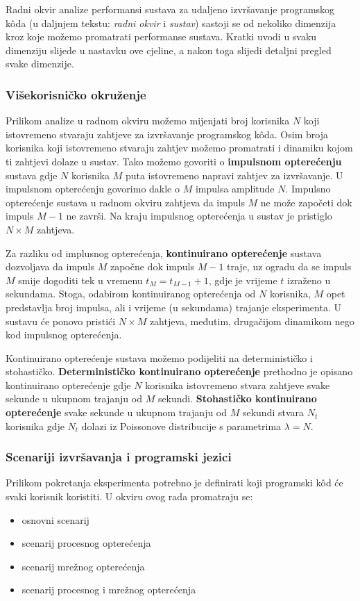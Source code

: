 \documentclass[times, utf8, diplomski]{fer}
\begin{document}
Radni okvir analize performansi sustava za udaljeno izvršavanje programskog kôda (u daljnjem tekstu: \textit{radni okvir} i \textit{sustav}) sastoji se od nekoliko dimenzija kroz koje možemo promatrati performanse sustava. Kratki uvodi u svaku dimenziju slijede u nastavku ove cjeline, a nakon toga slijedi detaljni pregled svake dimenzije.

\subsubsection{Višekorisničko okruženje}
Prilikom analize u radnom okviru možemo mijenjati broj korisnika $N$ koji istovremeno stvaraju zahtjeve za izvršavanje programskog kôda. Osim broja korisnika koji istovremeno stvaraju zahtjev možemo promatrati i dinamiku kojom ti zahtjevi dolaze u sustav. Tako možemo govoriti o \textbf{impulsnom opterećenju} sustava gdje $N$ korisnika $M$ puta istovremeno napravi zahtjev za izvršavanje. U impulsnom opterećenju govorimo dakle o $M$ impulsa amplitude $N$. Impulsno opterećenje sustava u radnom okviru zahtjeva da impuls $M$ ne može započeti dok impuls $M-1$ ne završi. Na kraju impulsnog opterećenja u sustav je pristiglo $N \times M$ zahtjeva.

Za razliku od implusnog opterećenja, \textbf{kontinuirano opterećenje} sustava dozvoljava da impuls $M$ započne dok impuls $M-1$ traje, uz ogradu da se impuls $M$ smije dogoditi tek u vremenu $t_{M} = t_{M-1} + 1$, gdje je vrijeme $t$ izraženo u sekundama. Stoga, odabirom kontinuiranog opterećenja od $N$ korisnika, $M$ opet predstavlja broj impulsa, ali i vrijeme (u sekundama) trajanje eksperimenta. U sustavu će ponovo pristići $N \times M$ zahtjeva, međutim, drugačijom dinamikom nego kod impulsnog opterećenja.

Kontinuirano opterećenje sustava možemo podijeliti na determinističko i stohastičko. \textbf{Determinističko kontinuirano opterećenje} prethodno je opisano kontinuirano opterećenje gdje $N$ korisnika istovremeno stvara zahtjeve svake sekunde u ukupnom trajanju od $M$ sekundi. \textbf{Stohastičko kontinuirano opterećenje} svake sekunde u ukupnom trajanju od $M$ sekundi stvara $N_t$ korisnika gdje $N_t$ dolazi iz Poissonove distribucije s parametrima $\lambda = N$.

\subsubsection{Scenariji izvršavanja i programski jezici}
Prilikom pokretanja eksperimenta potrebno je definirati koji programski kôd će svaki korisnik koristiti. U okviru ovog rada promatraju se:
\begin{itemize}
    \item osnovni scenarij
    \item scenarij procesnog opterećenja
    \item scenarij mrežnog opterećenja
    \item scenarij procesnog i mrežnog opterećenja
\end{itemize}
\end{document}
